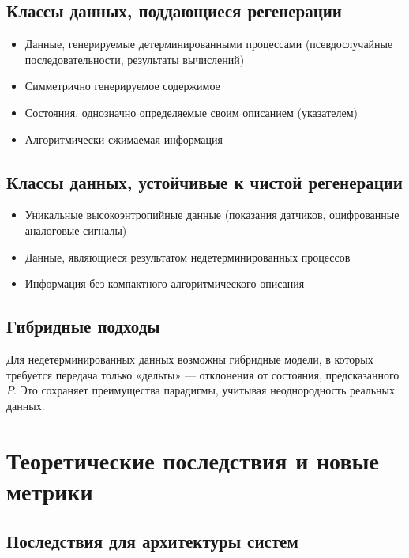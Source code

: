 \documentclass[11pt,a4paper]{article}
\begin{document}
\subsection{Классы данных, поддающиеся регенерации}

\begin{itemize}
    \item Данные, генерируемые детерминированными процессами (псевдослучайные последовательности, результаты вычислений)
    \item Симметрично генерируемое содержимое
    \item Состояния, однозначно определяемые своим описанием (указателем)
    \item Алгоритмически сжимаемая информация
\end{itemize}

\subsection{Классы данных, устойчивые к чистой регенерации}

\begin{itemize}
    \item Уникальные высокоэнтропийные данные (показания датчиков, оцифрованные аналоговые сигналы)
    \item Данные, являющиеся результатом недетерминированных процессов
    \item Информация без компактного алгоритмического описания
\end{itemize}

\subsection{Гибридные подходы}

Для недетерминированных данных возможны гибридные модели, в которых требуется передача только «дельты» — отклонения от состояния, предсказанного $P$. Это сохраняет преимущества парадигмы, учитывая неоднородность реальных данных.

\section{Теоретические последствия и новые метрики}

\subsection{Последствия для архитектуры систем}
\end{document}
